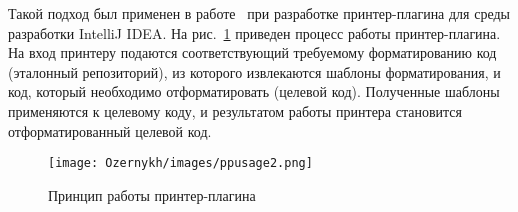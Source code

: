 
Такой подход был применен в работе~\cite{paper:while} при разработке принтер-плагина для среды разработки IntelliJ IDEA. %
На рис.~\ref{intro:howto} приведен процесс работы принтер-плагина. 
На вход принтеру подаются соответствующий требуемому форматированию код (эталонный репозиторий), из которого извлекаются шаблоны форматирования, и код, который необходимо отформатировать (целевой код).
Полученные шаблоны применяются к целевому коду, и результатом работы принтера становится отформатированный целевой код.


\begin{figure}
    \centering
    \texttt{[image: Ozernykh/images/ppusage2.png]}
    \caption{Принцип работы принтер-плагина}
    \label{intro:howto}

\end{figure}

